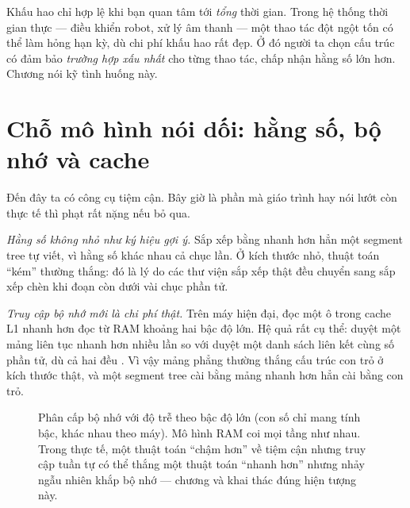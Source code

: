 \documentclass[../../algorithm.tex]{subfiles}
\begin{document}
\begin{cambay}
Khấu hao chỉ hợp lệ khi bạn quan tâm tới \emph{tổng} thời gian. Trong hệ thống thời gian thực --- điều khiển robot, xử lý âm thanh --- một thao tác đột ngột tốn  có thể làm hỏng hạn kỳ, dù chi phí khấu hao rất đẹp. Ở đó người ta chọn cấu trúc có đảm bảo \emph{trường hợp xấu nhất} cho từng thao tác, chấp nhận hằng số lớn hơn. Chương  nói kỹ tình huống này.
\end{cambay}

\section{Chỗ mô hình nói dối: hằng số, bộ nhớ và cache}

Đến đây ta có công cụ tiệm cận. Bây giờ là phần mà giáo trình hay nói lướt còn thực tế thì phạt rất nặng nếu bỏ qua.

\emph{Hằng số không nhỏ như ký hiệu gợi ý.} Sắp xếp  bằng  nhanh hơn hẳn một segment tree  tự viết, vì hằng số khác nhau cả chục lần. Ở kích thước nhỏ, thuật toán ``kém'' thường thắng: đó là lý do các thư viện sắp xếp thật đều chuyển sang sắp xếp chèn khi đoạn còn dưới vài chục phần tử\cite{bentley1993sort,musser1997}.

\emph{Truy cập bộ nhớ mới là chi phí thật.} Trên máy hiện đại, đọc một ô trong cache L1 nhanh hơn đọc từ RAM khoảng hai bậc độ lớn. Hệ quả rất cụ thể: duyệt một mảng liên tục nhanh hơn nhiều lần so với duyệt một danh sách liên kết cùng số phần tử, dù cả hai đều . Vì vậy mảng phẳng thường thắng cấu trúc con trỏ ở kích thước thật, và một segment tree cài bằng mảng nhanh hơn hẳn cài bằng con trỏ.

\begin{figure}[H]\centering
{}
\caption{Phân cấp bộ nhớ với độ trễ theo bậc độ lớn (con số chỉ mang tính bậc, khác nhau theo máy). Mô hình RAM coi mọi tầng như nhau. Trong thực tế, một thuật toán ``chậm hơn'' về tiệm cận nhưng truy cập tuần tự có thể thắng một thuật toán ``nhanh hơn'' nhưng nhảy ngẫu nhiên khắp bộ nhớ --- chương  và  khai thác đúng hiện tượng này.}
\label{fig:memhier}
\end{figure}
\end{document}
